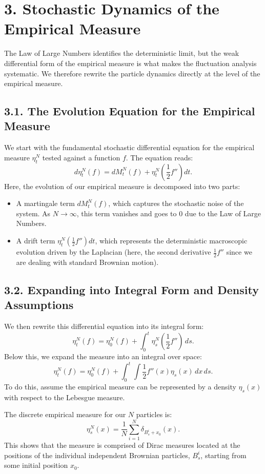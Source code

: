 \documentclass[11pt]{article}
\theoremstyle{definition}
\theoremstyle{remark}
\begin{document}
\section*{3. Stochastic Dynamics of the Empirical Measure}
The Law of Large Numbers identifies the deterministic limit, but the weak differential form of the empirical measure is what makes the fluctuation analysis systematic. We therefore rewrite the particle dynamics directly at the level of the empirical measure.

\subsection*{3.1. The Evolution Equation for the Empirical Measure}
We start with the fundamental stochastic differential equation for the empirical measure $\eta_t^N$ tested against a function $f$. The equation reads:
\[
d\eta_t^N(f)=dM_t^N(f)+\eta_t^N\!\left(\frac{1}{2}f''\right)dt.
\]
Here, the evolution of our empirical measure is decomposed into two parts:
\begin{itemize}
\item A martingale term $dM_t^N(f)$, which captures the stochastic noise of the system. As $N\to\infty$, this term vanishes and goes to $0$ due to the Law of Large Numbers.
\item A drift term $\eta_t^N\!\left(\frac{1}{2}f''\right)dt$, which represents the deterministic macroscopic evolution driven by the Laplacian (here, the second derivative $\frac{1}{2}f''$ since we are dealing with standard Brownian motion).
\end{itemize}

\subsection*{3.2. Expanding into Integral Form and Density Assumptions}
We then rewrite this differential equation into its integral form:
\[
\eta_t^N(f)=\eta_0^N(f)+\int_0^t \eta_s^N\!\left(\frac{1}{2}f''\right)\,ds.
\]
Below this, we expand the measure into an integral over space:
\[
\eta_t^N(f)=\eta_0^N(f)+\int_0^t \int \frac{1}{2}f''(x)\eta_s(x)\,dx\,ds.
\]
To do this, assume the empirical measure can be represented by a density $\eta_s(x)$ with respect to the Lebesgue measure.

The discrete empirical measure for our $N$ particles is:
\[
\eta_s^N(x)=\frac{1}{N}\sum_{i=1}^N \delta_{B_s^i+x_0}(x).
\]
This shows that the measure is comprised of Dirac measures located at the positions of the individual independent Brownian particles, $B_s^i$, starting from some initial position $x_0$.
\end{document}

